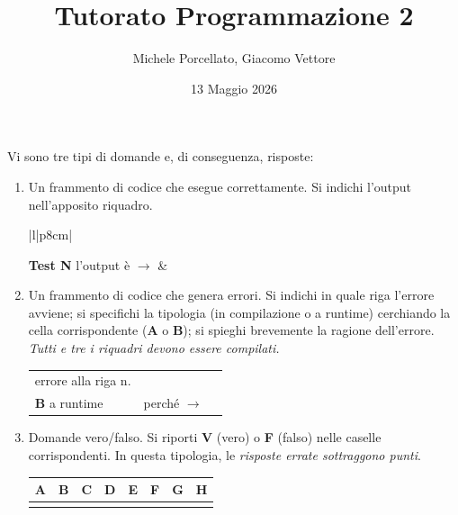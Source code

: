 \documentclass[a4paper,12pt]{article}
\title{Tutorato Programmazione 2}
\author{Michele Porcellato, Giacomo Vettore}
\date{13 Maggio 2026}
\begin{document}
\maketitle
\thispagestyle{empty}

\begin{tcolorbox}[colback=gray!8, colframe=black!60, title=\textbf{Istruzioni (leggere attentamente)}]
Vi sono tre tipi di domande e, di conseguenza, risposte:

\begin{enumerate}[leftmargin=*, label=\arabic*.]

\item Un frammento di codice che esegue correttamente. Si indichi l'output nell'apposito riquadro.

\smallskip
\noindent
\begin{tabular}{|l|p{8cm}|}
\hline
\rule{0pt}{1.6em}\textbf{Test N} \quad l'output è $\rightarrow$ & \\
\hline
\end{tabular}

\item Un frammento di codice che genera errori. Si indichi in quale riga l'errore avviene; si specifichi la tipologia (in compilazione o a runtime) cerchiando la cella corrispondente (\textbf{A} o \textbf{B}); si spieghi brevemente la ragione dell'errore. \emph{Tutti e tre i riquadri devono essere compilati.}

\smallskip
\noindent
\begin{tabularx}{\linewidth}{|p{3.2cm}|p{4cm}|X|}
\hline
\rule{0pt}{2.2em}errore alla riga n.\dotfill &
\begin{tabular}{@{}l@{}}
  \textbf{A} in compilazione \\[2pt]
  \textbf{B} a runtime
\end{tabular} &
perché $\rightarrow$ \\
\hline
\end{tabularx}

\item Domande vero/falso. Si riporti \textbf{V} (vero) o \textbf{F} (falso) nelle caselle corrispondenti. In questa tipologia, le \emph{risposte errate sottraggono punti}.

\smallskip
\noindent
\begin{tabular}{|c|c|c|c|c|c|c|c|}
\hline
\rule{0pt}{1.4em}\textbf{A} & \textbf{B} & \textbf{C} & \textbf{D} & \textbf{E} & \textbf{F} & \textbf{G} & \textbf{H} \\[2pt]
\hline
\phantom{XX} & \phantom{XX} & \phantom{XX} & \phantom{XX} & \phantom{XX} & \phantom{XX} & \phantom{XX} & \phantom{XX} \\
\hline
\end{tabular}

\end{enumerate}
\end{tcolorbox}
\end{document}
